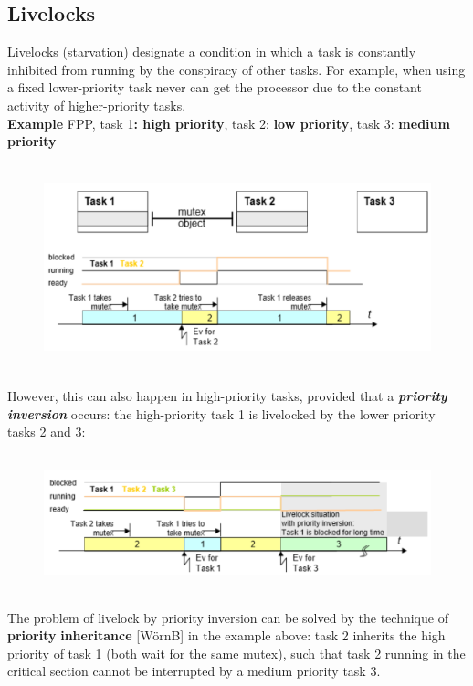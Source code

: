 \subsection{Livelocks}

Livelocks (starvation) designate a condition in which a task is constantly inhibited from running by the conspiracy of other tasks. For example, when using a fixed lower-priority task never can get the processor due to the constant activity of higher-priority tasks.\\

\textbf{Example} FPP, task 1\textbf{: high priority}, task 2:\textbf{ low priority}, task 3:\textbf{ medium priority}

\begin{figure}[h]
\centering
\includegraphics[width=12cm, height=6cm]{Images/image109.png}
\label{fig:Fig 55}
\end{figure}

However, this can also happen in high-priority tasks, provided that a \textbf{\textit{priority inversion}} occurs: the high-priority task 1 is livelocked by the lower priority tasks 2 and 3:

\begin{figure}[h]
\centering
\includegraphics[width=12cm, height=4cm]{Images/image110.png}
\label{fig:Fig 56}
\end{figure}

\newpage
The problem of livelock by priority inversion can be solved by the technique of \textbf{priority} \textbf{inheritance} [W\"{o}rnB]   in the example above: task 2 inherits the high priority of task 1 (both wait for the same mutex), such that task 2 running in the critical section cannot be interrupted by a medium priority task 3. \\

